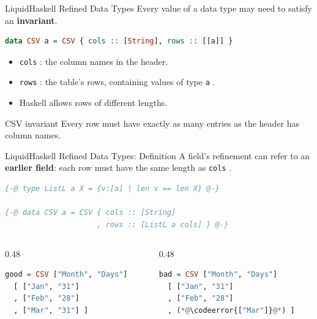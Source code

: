 \documentclass[aspectratio=169]{beamer}
\let\originaltexttt\texttt
\renewcommand{\texttt}[1]{%
  \begingroup
  \setlength{\fboxsep}{2pt}%
  \colorbox{themeTrack!65}{%
    \textcolor{themeText}{\originaltexttt{#1}}%
  }%
  \endgroup
}
\newcommand{\codeerror}[1]{%
  \begingroup
  \setlength{\fboxsep}{0pt}%
  \colorbox{themeAlert!12}{%
    \hspace{3pt}\color{themeAlert}\ttfamily\strut\detokenize{#1}\hspace{3pt}%
  }%
  \endgroup
}
\begin{document}
\begin{frame}[fragile]{LiquidHaskell Refined Data Types}
	Every value of a data type may need to satisfy an \textbf{invariant}.

	\begin{lstlisting}[language=Haskell]
data CSV a = CSV { cols :: [String], rows :: [[a]] }
\end{lstlisting}

	\begin{itemize}
		\item \texttt{cols}: the column names in the header.
		\item \texttt{rows}: the table's rows, containing values of type \texttt{a}.
		\item Haskell allows rows of different lengths.
	\end{itemize}

	\begin{exampleblock}{CSV invariant}
		\vspace{0.1em}
		Every row must have exactly as many entries as the header has column names.
	\end{exampleblock}
\end{frame}

\begin{frame}[fragile]{LiquidHaskell Refined Data Types: Definition}
	A field's refinement can refer to an \textbf{earlier field}: each row must have the same length as \texttt{cols}.

	\begin{lstlisting}[language=Haskell]
{-@ type ListL a X = {v:[a] | len v == len X} @-}

{-@ data CSV a = CSV { cols :: [String]
                     , rows :: [ListL a cols] } @-}
\end{lstlisting}

	\begin{columns}[T]
		\begin{column}{0.48\textwidth}
			\begin{lstlisting}[language=Haskell]
good = CSV ["Month", "Days"]
  [ ["Jan", "31"]
  , ["Feb", "28"]
  , ["Mar", "31"] ]
\end{lstlisting}
		\end{column}
		\begin{column}{0.48\textwidth}
			\begin{lstlisting}[language=Haskell]
bad = CSV ["Month", "Days"]
  [ ["Jan", "31"]
  , ["Feb", "28"]
  , (*@\codeerror{["Mar"]}@*) ]
\end{lstlisting}
		\end{column}
	\end{columns}
\end{frame}
\end{document}
